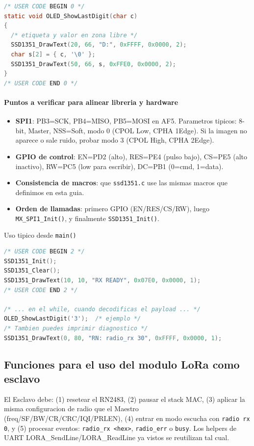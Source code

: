 \documentclass[a4paper,12pt]{article}
\begin{document}
\begin{lstlisting}[language=C, caption={Helper: mostrar un digito en la SSD1351}, label={lst:oled_show_digit}]
/* USER CODE BEGIN 0 */
static void OLED_ShowLastDigit(char c)
{
  /* etiqueta y valor en zona libre */
  SSD1351_DrawText(20, 66, "D:", 0xFFFF, 0x0000, 2);
  char s[2] = { c, '\0' };
  SSD1351_DrawText(50, 66, s, 0xFFE0, 0x0000, 2);
}
/* USER CODE END 0 */
\end{lstlisting}

\paragraph{Puntos a verificar para alinear libreria y hardware}
\begin{itemize}
  \item \textbf{SPI1}: PB3=SCK, PB4=MISO, PB5=MOSI en AF5. Parametros tipicos: 8-bit, Master, NSS=Soft, modo 0 (CPOL Low, CPHA 1Edge). 
        Si la imagen no aparece o sale ruido, probar modo 3 (CPOL High, CPHA 2Edge).
  \item \textbf{GPIO de control}: EN=PD2 (alto), RES=PE4 (pulso bajo), CS=PE5 (alto inactivo), RW=PC5 (low para escribir), DC=PB1 (0=cmd, 1=data).
  \item \textbf{Consistencia de macros}: que \texttt{ssd1351.c} use las mismas macros que definimos en esta guia.
  \item \textbf{Orden de llamadas}: primero GPIO (EN/RES/CS/RW), luego \texttt{MX\_SPI1\_Init()}, y finalmente \texttt{SSD1351\_Init()}.
\end{itemize}

Uso tipico desde \texttt{main()}
\begin{lstlisting}[language=C, caption={Uso sintetico en main(): init y mensaje}, label={lst:oled_use_main}]
/* USER CODE BEGIN 2 */
SSD1351_Init();
SSD1351_Clear();
SSD1351_DrawText(10, 10, "RX READY", 0x07E0, 0x0000, 1);
/* USER CODE END 2 */

/* ... en el while, cuando decodificas el payload ... */
OLED_ShowLastDigit('3');  /* ejemplo */
/* Tambien puedes imprimir diagnostico */
SSD1351_DrawText(0, 80, "RN: radio_rx 30", 0xFFFF, 0x0000, 1);
\end{lstlisting}

\subsection{Funciones para el uso del modulo LoRa como esclavo}

El Esclavo debe: (1) resetear el RN2483, (2) pausar el stack MAC, (3) aplicar la misma configuracion de radio que el Maestro (freq/SF/BW/CR/CRC/IQI/PRLEN), (4) entrar en modo escucha con \texttt{radio rx 0}, y (5) procesar eventos: \texttt{radio\_rx <hex>}, \texttt{radio\_err} o \texttt{busy}. 
Los helpers de UART 
LORA\_SendLine/LORA\_ReadLine
ya vistos se reutilizan tal cual.
\newpage
\end{document}
